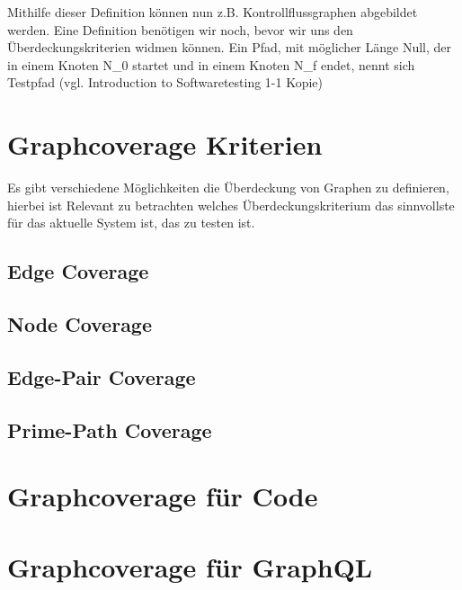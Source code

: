 Mithilfe dieser Definition können nun z.B. Kontrollflussgraphen abgebildet werden.
Eine Definition benötigen wir noch, bevor wir uns den Überdeckungskriterien widmen können.
Ein Pfad, mit möglicher Länge Null, der in einem Knoten N_{0} startet und in einem Knoten N_{f} endet, nennt sich Testpfad (vgl. Introduction to Softwaretesting 1-1 Kopie)

\section{Graphcoverage Kriterien}
Es gibt verschiedene Möglichkeiten die Überdeckung von Graphen zu definieren, hierbei ist Relevant zu betrachten welches Überdeckungskriterium das sinnvollste
für das aktuelle System ist, das zu testen ist.

\subsection{Edge Coverage}

\subsection{Node Coverage}

\subsection{Edge-Pair Coverage}

\subsection{Prime-Path Coverage}







\section{Graphcoverage für Code}

\section{Graphcoverage für GraphQL}




